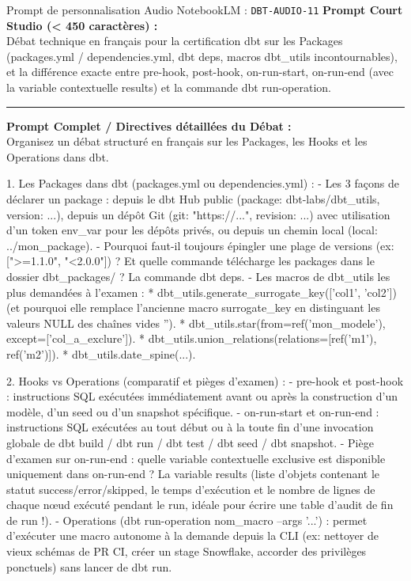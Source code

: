 \documentclass[11pt,a4paper]{article}
\begin{document}
\begin{promptbox}{Prompt de personnalisation Audio NotebookLM : \texttt{DBT-AUDIO-11}}
\textbf{Prompt Court Studio (< 450 caractères) :}\\
Débat technique en français pour la certification dbt sur les Packages (packages.yml / dependencies.yml, dbt deps, macros dbt\_utils incontournables), et la différence exacte entre pre-hook, post-hook, on-run-start, on-run-end (avec la variable contextuelle results) et la commande dbt run-operation.

\medskip\hrule\medskip
\textbf{Prompt Complet / Directives détaillées du Débat :}\\
Organisez un débat structuré en français sur les Packages, les Hooks et les Operations dans dbt.

1. Les Packages dans dbt (packages.yml ou dependencies.yml) :
- Les 3 façons de déclarer un package : depuis le dbt Hub public (package: dbt-labs/dbt\_utils, version: ...), depuis un dépôt Git (git: "https://...", revision: ...) avec utilisation d'un token env\_var pour les dépôts privés, ou depuis un chemin local (local: ../mon\_package).
- Pourquoi faut-il toujours épingler une plage de versions (ex: [">=1.1.0", "<2.0.0"]) ? Et quelle commande télécharge les packages dans le dossier dbt\_packages/ ? La commande dbt deps.
- Les macros de dbt\_utils les plus demandées à l'examen :
  * dbt\_utils.generate\_surrogate\_key(['col1', 'col2']) (et pourquoi elle remplace l'ancienne macro surrogate\_key en distinguant les valeurs NULL des chaînes vides '').
  * dbt\_utils.star(from=ref('mon\_modele'), except=['col\_a\_exclure']).
  * dbt\_utils.union\_relations(relations=[ref('m1'), ref('m2')]).
  * dbt\_utils.date\_spine(...).

2. Hooks vs Operations (comparatif et pièges d'examen) :
- pre-hook et post-hook : instructions SQL exécutées immédiatement avant ou après la construction d'un modèle, d'un seed ou d'un snapshot spécifique.
- on-run-start et on-run-end : instructions SQL exécutées au tout début ou à la toute fin d'une invocation globale de dbt build / dbt run / dbt test / dbt seed / dbt snapshot.
- Piège d'examen sur on-run-end : quelle variable contextuelle exclusive est disponible uniquement dans on-run-end ? La variable results (liste d'objets contenant le statut success/error/skipped, le temps d'exécution et le nombre de lignes de chaque nœud exécuté pendant le run, idéale pour écrire une table d'audit de fin de run !).
- Operations (dbt run-operation nom\_macro --args '{...}') : permet d'exécuter une macro autonome à la demande depuis la CLI (ex: nettoyer de vieux schémas de PR CI, créer un stage Snowflake, accorder des privilèges ponctuels) sans lancer de dbt run.
\end{promptbox}
\end{document}
